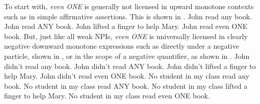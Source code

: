 To start with, \textit{even \MakeUppercase{one}} is generally not licensed in upward monotone contexts such as in simple affirmative assertions. This is shown in .
\pex[nopreamble=true]\label{ex:even-um}%
\a{}\ljudge{\#} John read any book.
\a{}\ljudge{\#} John read \MakeUppercase{any} book.
\a{}\ljudge{\#} John lifted a finger to help Mary.
\a{}\ljudge{\#} John read even \MakeUppercase{one} book.
\xe
But, just like all weak NPIs, \textit{even ONE} is universally licensed in clearly negative downward monotone expressions such as directly under a negative particle, shown in , or in the scope of a negative quantifier, as shown in .
\pex[nopreamble=true]\label{ex:even-negation}%
\a{} John didn't read any book.
\a{} John didn't read \MakeUppercase{any} book.
\a{} John didn't lifted a finger to help Mary.
\a{} John didn't read even \MakeUppercase{one} book.
\xe
\pex[nopreamble=true]\label{ex:even-dm}%
\a{} No student in my class read any book.
\a{} No student in my class read \MakeUppercase{any} book.
\a{} No student in my class lifted a finger to help Mary.
\a{} No student in my class read even \MakeUppercase{one} book.
\xe

